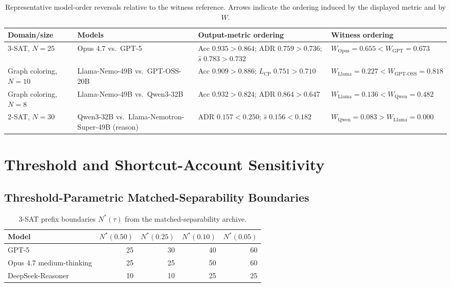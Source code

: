 \documentclass[acmsmall,screen,review,anonymous]{acmart}
\begin{document}
\begin{table}[t]
\centering
\caption{Representative model-order reversals relative to the witness
reference. Arrows indicate the ordering induced by the displayed metric and
by \(W\).}
\label{tab:supp-reversal-examples}
\renewcommand{\arraystretch}{1.08}
\begin{tabularx}{\textwidth}{p{}p{}p{}X}
\toprule
Domain/size & Models & Output-metric ordering & Witness ordering\\
\midrule
3-SAT, \(N=25\)
& Opus 4.7 vs.\ GPT-5
& Acc \(0.935>0.864\); ADR \(0.759>0.736\);
\(\hat{s}\;0.783>0.732\)
& \(W_{\mathrm{Opus}}=0.655 <
W_{\mathrm{GPT}}=0.673\)\\
Graph coloring, \(N=10\)
& Llama-Nemo-49B vs.\ GPT-OSS-20B
& Acc \(0.909>0.886\);
\(L_{\mathrm{CP}}\;0.751>0.710\)
& \(W_{\mathrm{Llama}}=0.227 <
W_{\mathrm{GPT\mbox{-}OSS}}=0.818\)\\
Graph coloring, \(N=8\)
& Llama-Nemo-49B vs.\ Qwen3-32B
& Acc \(0.932>0.824\); ADR \(0.864>0.647\)
& \(W_{\mathrm{Llama}}=0.136 <
W_{\mathrm{Qwen}}=0.482\)\\
2-SAT, \(N=30\)
& Qwen3-32B vs.\ Llama-Nemotron-Super-49B (reason)
& ADR \(0.157<0.250\); \(\hat{s}\;0.156<0.182\)
& \(W_{\mathrm{Qwen}}=0.083 >
W_{\mathrm{Llama}}=0.000\)\\
\bottomrule
\end{tabularx}
\end{table}

\section{Threshold and Shortcut-Account Sensitivity}
\label{sec:supp-boundaries}

\subsection{Threshold-Parametric Matched-Separability Boundaries}

\begin{table}[t]
\centering
\caption{3-SAT prefix boundaries \(N^*(\tau)\) from the
matched-separability archive.}
\label{tab:supp-threshold-3sat}
\renewcommand{\arraystretch}{1.08}
\begin{tabular}{lrrrr}
\toprule
Model & \(N^*(0.50)\) & \(N^*(0.25)\) & \(N^*(0.10)\) & \(N^*(0.05)\)\\
\midrule
GPT-5 & 25 & 30 & 40 & 60\\
Opus 4.7 medium-thinking & 25 & 25 & 50 & 60\\
DeepSeek-Reasoner & 10 & 10 & 25 & 25\\
\bottomrule
\end{tabular}
\end{table}
\end{document}
